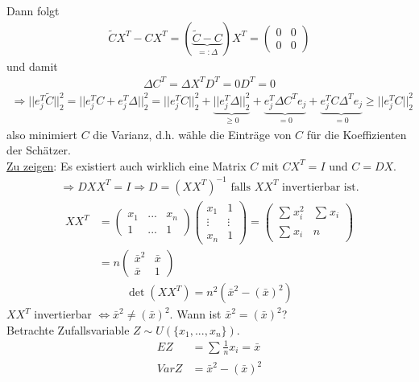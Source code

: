 \documentclass[a4paper,openany]{book}
\theoremstyle{mytheoremstyle}
\theoremstyle{mytheoremstyle2}
\begin{document}
Dann folgt
\begin{align*}
  \tilde{C}X^T-CX^T=(\underbrace{\tilde{C}-C}_{=:\Delta})X^T=\begin{pmatrix}0&0\\0&0\end{pmatrix}
\end{align*}
und damit
\begin{align*}
  \Delta C^T=\Delta X^TD^T=0D^T={0}
\end{align*}
\begin{align*}
  \Rightarrow ||e_j^T \tilde{C}||_2^2=||e_j^TC+e_j^T\Delta||_2^2=||e_j^TC||_2^2+\underbrace{||e_j^T\Delta||_2^2}_{\geq 0}+\underbrace{e_j^T\Delta C^Te_j}_{=0}+\underbrace{e_j^TC\Delta ^Te_j}_{=0}\geq ||e_j^TC||_2^2
\end{align*}
also minimiert $C$ die Varianz, d.h. wähle die Einträge von $C$ für die Koeffizienten der Schätzer. \\
\underline{Zu zeigen}: Es existiert auch wirklich eine Matrix $C$ mit $CX^T=I$ und $C=DX$. 
\begin{align*}
  \Rightarrow DXX^T=I \Rightarrow D=(XX^T)^{-1} \text{ falls }XX^T \text{ invertierbar ist.}
\end{align*}
\begin{align*}
  XX^T&=\begin{pmatrix}
    x_1&...&x_n\\1&...&1
  \end{pmatrix}\begin{pmatrix}
    x_1&1\\\vdots&\vdots\\x_n&1
  \end{pmatrix}=\begin{pmatrix}
    \sum_{}^{}{x_i^2}&\sum_{}^{}{x_i}\\\sum_{}^{}{x_i}&n
  \end{pmatrix} \\
      &=n \begin{pmatrix}
        \bar{x}^2&\bar{x}\\\bar{x}&1
      \end{pmatrix}
\end{align*}
\begin{align*}
  \det(XX^T)=n^2\left(\bar{x}^2-(\bar{x})^2\right)
\end{align*}
$XX^T$ invertierbar $\Leftrightarrow \bar{x}^2\neq (\bar{x})^2$. Wann ist $\bar{x}^2=(\bar{x})^2$? \\
Betrachte Zufallsvariable $Z\sim U(\{x_1,...,x_n\}) $. 
\begin{align*}
  EZ&=\sum_{}^{}{\frac{1}{n}x_i}=\bar{x}\\
  VarZ&=\bar{x}^2-(\bar{x})^2
\end{align*}
\end{document}
